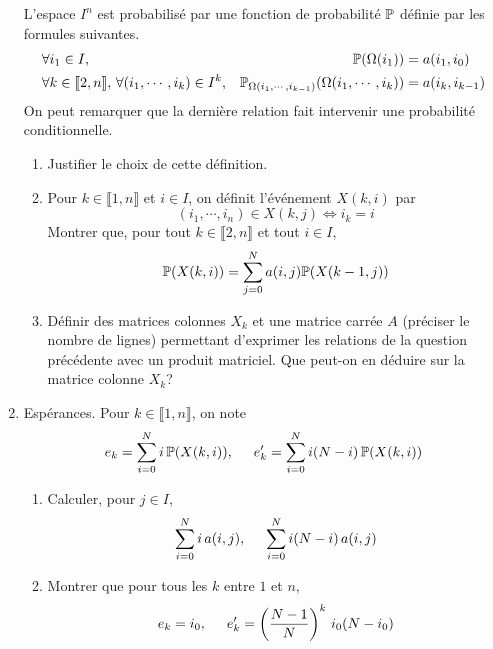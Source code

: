 \begin{enumerate}
L'espace $I^n$ est probabilisé par une fonction de probabilité $\mathbb{P}$ définie par les formules suivantes.
\begin{align*}
  &\forall i_1 \in I, &\mathbb{P}(\Omega(i_1)) &= a(i_1,i_0)\\
  &\forall k\in \llbracket 2,n\rrbracket,\, \forall(i_1,\cdots,i_k)\in I^k,
  &\mathbb{P}_{\Omega(i_1,\cdots,i_{k-1})}(\Omega(i_1,\cdots,i_k)) &= a(i_k,i_{k-1})
\end{align*}
On peut remarquer que la dernière relation fait intervenir une probabilité conditionnelle.
\begin{enumerate}
  \item Justifier le choix de cette définition.
  \item Pour $k\in \llbracket 1,n \rrbracket$ et $i\in I$, on définit l'événement $X(k,i)$ par 
\begin{displaymath}
  (i_1,\cdots,i_n)\in X(k,j) \Leftrightarrow i_k = i
\end{displaymath}
Montrer que, pour tout $k \in \llbracket 2,n \rrbracket$ et tout $i\in I$,
\begin{displaymath}
\mathbb{P}(X(k,i)) = \sum_{j=0}^N a(i,j)\mathbb{P}(X(k-1,j))
\end{displaymath}
  \item Définir des matrices colonnes $X_k$ et une matrice carrée $A$ (préciser le nombre de lignes) permettant d'exprimer les relations de la question précédente avec un produit matriciel. Que peut-on en déduire sur la matrice colonne $X_k$?
\end{enumerate}

  \item Espérances.\newline
Pour $k\in \llbracket 1, n\rrbracket$, on note 
\begin{displaymath}
  e_k = \sum_{i=0}^N i\,\mathbb{P}(X(k,i)), \hspace{0.5cm} e'_k = \sum_{i=0}^N i(N-i)\,\mathbb{P}(X(k,i))
\end{displaymath}

\begin{enumerate}
  \item Calculer, pour $j\in I$,
\begin{displaymath}
  \sum_{i=0}^N i\,a(i,j) ,\hspace{0.5cm} \sum_{i=0}^N i(N-i)\,a(i,j) 
\end{displaymath}
  \item Montrer que pour tous les $k$ entre $1$ et $n$,
\begin{displaymath}
  e_k = i_0, \hspace{0.5cm} e'_k = \left( \frac{N-1}{N}\right)^{k}\, i_0( N - i_0) 
\end{displaymath}
\end{enumerate}
   

\end{enumerate}
